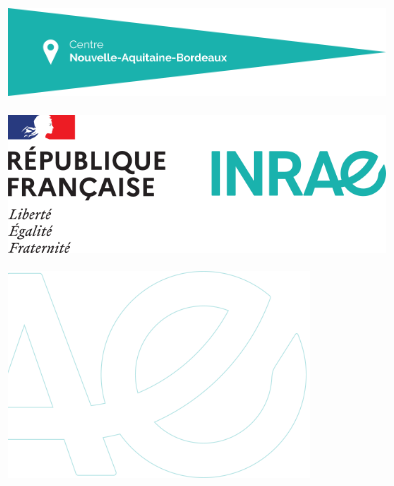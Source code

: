 \makeatletter
\let\inserttitle\@title
\makeatother
\makeatletter
\let\insertauthor\@author
\makeatother
\makeatletter
\let\insertdate\@date
\makeatother


\vspace*{-4.5cm}

%

\vspace*{12.15cm}

\hspace{-2.7cm}
\includegraphics[width=10cm]{_extensions/quarto-inrae/ressources/cartouche}\par

\hspace{12cm}
\includegraphics[width=10cm]{_extensions/quarto-inrae/ressources/bloc-etat}\par
\vspace*{-2cm}

\hspace{-2.8cm}
\includegraphics[width=8cm]{_extensions/quarto-inrae/ressources/sigle-inrae}

\vspace*{1cm}

